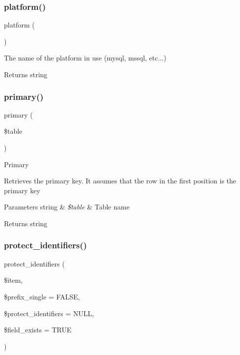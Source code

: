 \subsubsection{\texorpdfstring{platform()}{platform()}}
{\footnotesize\ttfamily platform (\begin{DoxyParamCaption}{ }\end{DoxyParamCaption})}

The name of the platform in use (mysql, mssql, etc...)

\begin{DoxyReturn}{Returns}
string 
\end{DoxyReturn}
\mbox{\label{class_c_i___d_b__driver_a68e5f4a4a6fdb79a9a403b045c59b618}} 
\subsubsection{\texorpdfstring{primary()}{primary()}}
{\footnotesize\ttfamily primary (\begin{DoxyParamCaption}\item[{}]{\$table }\end{DoxyParamCaption})}

Primary

Retrieves the primary key. It assumes that the row in the first position is the primary key


\begin{DoxyParams}[1]{Parameters}
string & {\em \$table} & Table name \\
\hline
\end{DoxyParams}
\begin{DoxyReturn}{Returns}
string 
\end{DoxyReturn}
\mbox{\label{class_c_i___d_b__driver_ade8e28ac268bbe2f985c5359bc949f21}} 
\subsubsection{\texorpdfstring{protect\+\_\+identifiers()}{protect\_identifiers()}}
{\footnotesize\ttfamily protect\+\_\+identifiers (\begin{DoxyParamCaption}\item[{}]{\$item,  }\item[{}]{\$prefix\+\_\+single = {\ttfamily FALSE},  }\item[{}]{\$protect\+\_\+identifiers = {\ttfamily NULL},  }\item[{}]{\$field\+\_\+exists = {\ttfamily TRUE} }\end{DoxyParamCaption})}

